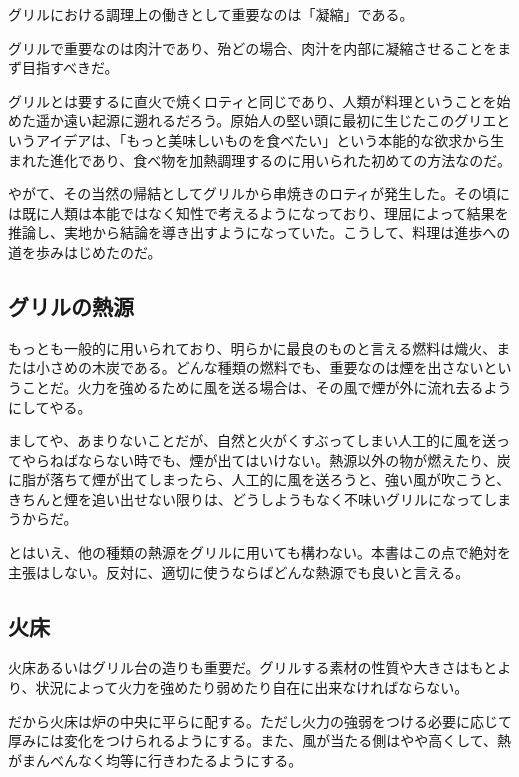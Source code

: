 グリルにおける調理上の働きとして重要なのは「凝縮」である。

グリルで重要なのは肉汁であり、殆どの場合、肉汁を内部に凝縮させることをまず目指すべきだ。

グリルとは要するに直火で焼くロティと同じであり、人類が料理ということを始めた遥か遠い起源に遡れるだろう。原始人の堅い頭に最初に生じたこのグリエというアイデアは、「もっと美味しいものを食べたい」という本能的な欲求から生まれた進化であり、食べ物を加熱調理するのに用いられた初めての方法なのだ。

やがて、その当然の帰結としてグリルから串焼きのロティが発生した。その頃には既に人類は本能ではなく知性で考えるようになっており、理屈によって結果を推論し、実地から結論を導き出すようになっていた。こうして、料理は進歩への道を歩みはじめたのだ。

\hypertarget{ux30b0ux30eaux30ebux306eux71b1ux6e90}{%
\subsection{グリルの熱源}\label{ux30b0ux30eaux30ebux306eux71b1ux6e90}}

もっとも一般的に用いられており、明らかに最良のものと言える燃料は熾火、または小さめの木炭である。どんな種類の燃料でも、重要なのは煙を出さないということだ。火力を強めるために風を送る場合は、その風で煙が外に流れ去るようにしてやる。

ましてや、あまりないことだが、自然と火がくすぶってしまい人工的に風を送ってやらねばならない時でも、煙が出てはいけない。熱源以外の物が燃えたり、炭に脂が落ちて煙が出てしまったら、人工的に風を送ろうと、強い風が吹こうと、きちんと煙を追い出せない限りは、どうしようもなく不味いグリルになってしまうからだ。

とはいえ、他の種類の熱源をグリルに用いても構わない。本書はこの点で絶対を主張はしない。反対に、適切に使うならばどんな熱源でも良いと言える。

\hypertarget{ux706bux5e8a}{%
\subsection{火床}\label{ux706bux5e8a}}

火床あるいはグリル台の造りも重要だ。グリルする素材の性質や大きさはもとより、状況によって火力を強めたり弱めたり自在に出来なければならない。

だから火床は炉の中央に平らに配する。ただし火力の強弱をつける必要に応じて厚みには変化をつけられるようにする。また、風が当たる側はやや高くして、熱がまんべんなく均等に行きわたるようにする。

